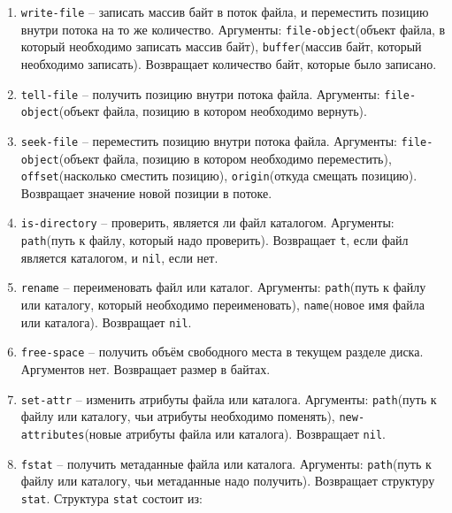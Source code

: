 \begin{enumerate}
	\item \texttt{write-file} -- записать массив байт в поток файла, и переместить позицию внутри потока на то же количество. Аргументы: \texttt{file-object}(объект файла, в который необходимо записать массив байт), \texttt{buffer}(массив байт, который необходимо записать). Возвращает количество байт, которые было записано.
	\item \texttt{tell-file} -- получить позицию внутри потока файла. Аргументы: \texttt{file-object}(объект файла, позицию в котором необходимо вернуть).
	\item \texttt{seek-file} -- переместить позицию внутри потока файла. Аргументы: \texttt{file-object}(объект файла, позицию в котором необходимо переместить), \texttt{offset}(насколько сместить позицию), \texttt{origin}(откуда смещать позицию). Возвращает значение новой позиции в потоке.
	\item \texttt{is-directory} -- проверить, является ли файл каталогом. Аргументы: \texttt{path}(путь к файлу, который надо проверить). Возвращает \texttt{t}, если файл является каталогом, и \texttt{nil}, если нет.
	\item \texttt{rename} -- переименовать файл или каталог. Аргументы: \texttt{path}(путь к файлу или каталогу, который необходимо переименовать), \texttt{name}(новое имя файла или каталога). Возвращает \texttt{nil}.
	\item \texttt{free-space} -- получить объём свободного места в текущем разделе диска. Аргументов нет. Возвращает размер в байтах.
	\item \texttt{set-attr} -- изменить атрибуты файла или каталога. Аргументы: \texttt{path}(путь к файлу или каталогу, чьи атрибуты необходимо поменять), \texttt{new-attributes}(новые атрибуты файла или каталога). Возвращает \texttt{nil}.
	\item \texttt{fstat} -- получить метаданные файла или каталога. Аргументы: \texttt{path}(путь к файлу или каталогу, чьи метаданные надо получить). Возвращает структуру \texttt{stat}. Структура \texttt{stat} состоит из:
	

\end{enumerate}
